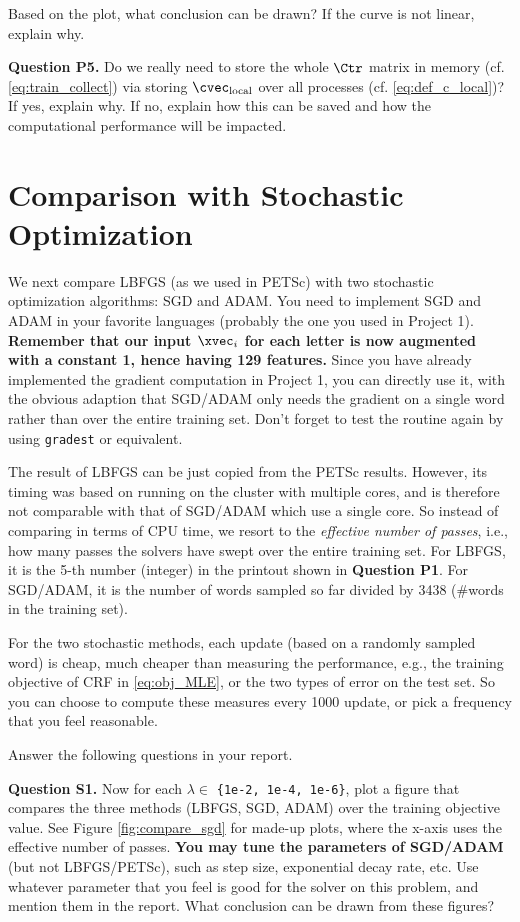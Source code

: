\documentclass[11pt]{report}
\begin{document}
Based on the plot, what conclusion can be drawn?
If the curve is not linear, explain why.


{\bf Question P5.}
Do we really need to store the whole $\Ctr$ matrix in memory (cf. \eqref{eq:train_collect}) via storing $\cvec_{\text{local}}$ over all processes (cf. \eqref{eq:def_c_local})?
If yes, explain why.
If no, explain how this can be saved and how the computational performance will be impacted.




\section{Comparison with Stochastic Optimization}

We next compare LBFGS (as we used in PETSc) with two stochastic optimization algorithms: SGD and ADAM.
You need to implement SGD and ADAM in your favorite languages (probably the one you used in Project 1).
{\bf Remember that our input $\xvec_i$ for each letter is now augmented with a constant 1, hence having 129 features.}
Since you have already implemented the gradient computation in Project 1, 
you can directly use it,
with the obvious adaption that SGD/ADAM only needs the gradient on a single word rather than over the entire training set.
Don't forget to test the routine again by using \verb#gradest# or equivalent.


The result of LBFGS can be just copied from the PETSc results.
However, its timing was based on running on the cluster with multiple cores,
and is therefore not comparable with that of SGD/ADAM which use a single core.
So instead of comparing in terms of CPU time, 
we resort to the \emph{effective number of passes}, 
i.e., how many passes the solvers have swept over the entire training set.
For LBFGS, it is the 5-th number (integer) in the printout shown in {\bf Question P1}.
For SGD/ADAM, it is the number of words sampled so far divided by 3438
(\#words in the training set).

For the two stochastic methods, each update (based on a randomly sampled word) is cheap, 
much cheaper than measuring the performance,
e.g., the training objective of CRF in \eqref{eq:obj_MLE}, or the two types of error on the test set.
So you can choose to compute these measures every 1000 update, 
or pick a frequency that you feel reasonable.



Answer the following questions in your report.

{\bf Question S1.}
%
Now for each $\lambda \in$ \verb!{1e-2, 1e-4, 1e-6}!,
plot a figure that compares the three methods (LBFGS, SGD, ADAM) over the training objective value.
See Figure \ref{fig:compare_sgd} for made-up plots,
where the x-axis uses the effective number of passes.
{\bf You may tune the parameters of SGD/ADAM} (but not LBFGS/PETSc),
such as step size, exponential decay rate, etc.
Use whatever parameter that you feel is good for the solver on this problem,
and mention them in the report.
What conclusion can be drawn from these figures?
\end{document}
